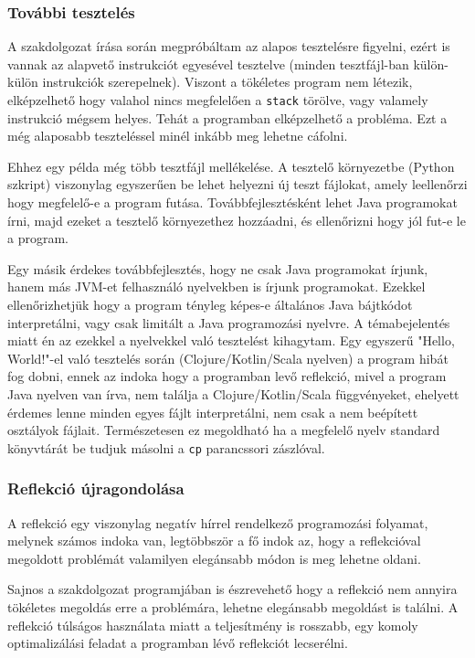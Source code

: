 \subsubsection{További tesztelés}

A szakdolgozat írása során megpróbáltam az alapos tesztelésre figyelni, ezért is vannak az alapvető instrukciót egyesével tesztelve (minden tesztfájl-ban külön-külön instrukciók szerepelnek). Viszont a tökéletes program nem létezik, elképzelhető hogy valahol nincs megfelelően a \lstinline{stack} törölve, vagy valamely instrukció mégsem helyes. Tehát a programban elképzelhető a probléma. Ezt a még alaposabb teszteléssel minél inkább meg lehetne cáfolni.

Ehhez egy példa még több tesztfájl mellékelése. A tesztelő környezetbe (Python szkript) viszonylag egyszerűen be lehet helyezni új teszt fájlokat, amely leellenőrzi hogy megfelelő-e a program futása. Továbbfejlesztésként lehet Java programokat írni, majd ezeket a tesztelő környezethez hozzáadni, és ellenőrizni hogy jól fut-e le a program.

Egy másik érdekes továbbfejlesztés, hogy ne csak Java programokat írjunk, hanem más JVM-et felhasználó nyelvekben is írjunk programokat. Ezekkel ellenőrizhetjük hogy a program tényleg képes-e általános Java bájtkódot interpretálni, vagy csak limitált a Java programozási nyelvre. A témabejelentés miatt én az ezekkel a nyelvekkel való tesztelést kihagytam. Egy egyszerű "Hello, World!"-el való tesztelés során (Clojure/Kotlin/Scala nyelven) a program hibát fog dobni, ennek az indoka hogy a programban levő reflekció, mivel a program Java nyelven van írva, nem találja a Clojure/Kotlin/Scala függvényeket, ehelyett érdemes lenne minden egyes fájlt interpretálni, nem csak a nem beépített osztályok fájlait. Természetesen ez megoldható ha a megfelelő nyelv standard könyvtárát be tudjuk másolni a \lstinline{cp} parancssori zászlóval.

\subsubsection{Reflekció újragondolása}

A reflekció egy viszonylag negatív hírrel rendelkező programozási folyamat, melynek számos indoka van, legtöbbször a fő indok az, hogy a reflekcióval megoldott problémát valamilyen elegánsabb módon is meg lehetne oldani.

Sajnos a szakdolgozat programjában is észrevehető hogy a reflekció nem annyira tökéletes megoldás erre a problémára, lehetne elegánsabb megoldást is találni. A reflekció túlságos használata miatt a teljesítmény is rosszabb, egy komoly optimalizálási feladat a programban lévő reflekciót lecserélni.

